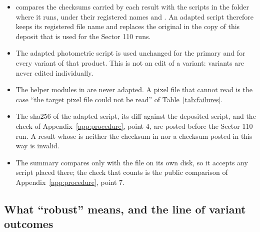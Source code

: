 \begin{itemize}
\item {} compares the checksums carried by each result with the scripts in the folder where it
  runs, under their registered names  and . An adapted script therefore
  keeps its registered file name and replaces the original in the copy of this deposit that is used for the Sector 110
  runs.
\item The adapted photometric script is used unchanged for the primary and for every variant of that product. This is
  not an edit of a variant: variants are never edited individually.
\item The helper modules in  are never adapted. A pixel file that  cannot read is
  the case ``the target pixel file could not be read'' of Table~\ref{tab:failures}.
\item The sha256 of the adapted script, its diff against the deposited script, and the check of
  Appendix~\ref{app:procedure}, point 4, are posted before the Sector 110 run. A result whose  is
  neither the checksum in  nor a checksum posted in this way is invalid.
\item The summary compares only with the file on its own disk, so it accepts any script placed there; the check that
  counts is the public comparison of Appendix~\ref{app:procedure}, point 7.
\end{itemize}

\subsection{What ``robust'' means, and the line of variant outcomes} \label{app:p7}

